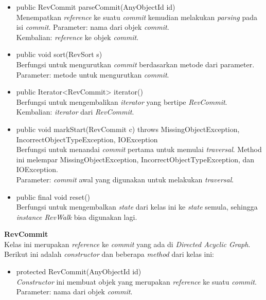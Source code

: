 \documentclass[a4paper,twoside]{article}
\begin{document}
\begin{enumerate}
\begin{itemize}
\item public RevCommit parseCommit(AnyObjectId id)\\
Menempatkan \textit{reference} ke suatu \textit{commit} kemudian melakukan \textit{parsing} pada isi \textit{commit}.
Parameter: nama dari objek \textit{commit}.\\
Kembalian: \textit{reference} ke objek \textit{commit}.

\item public void sort(RevSort s)\\
Berfungsi untuk mengurutkan \textit{commit} berdasarkan metode dari parameter.\\
Parameter: metode untuk mengurutkan \textit{commit}.

\item public Iterator<RevCommit> iterator()\\
Berfungsi untuk mengembalikan \textit{iterator} yang bertipe \textit{RevCommit}.\\
Kembalian: \textit{iterator} dari \textit{RevCommit}.

\item public void markStart(RevCommit c) throws MissingObjectException, IncorrectObjectTypeException, IOException\\
Berfungsi untuk menandai \textit{commit} pertama untuk memulai \textit{traversal}. Method ini melempar MissingObjectException, IncorrectObjectTypeException, dan IOException.\\
Parameter: \textit{commit} awal yang digunakan untuk melakukan \textit{traversal}.

\item public final void reset()\\
Berfungsi untuk mengembalkan \textit{state} dari kelas ini ke \textit{state} semula, sehingga \textit{instance RevWalk} bisa digunakan lagi.
\end{itemize}

\textbf{RevCommit}\\
Kelas ini merupakan \textit{reference} ke \textit{commit} yang ada di \textit{Directed Acyclic Graph}. Berikut ini adalah \textit{constructor} dan beberapa \textit{method} dari kelas ini:
\begin{itemize}
\item protected RevCommit(AnyObjectId id)\\
\textit{Constructor} ini membuat objek yang merupakan \textit{reference} ke suatu \textit{commit}.\\
Parameter: nama dari objek \textit{commit}.  


\end{itemize}
\end{enumerate}
\end{document}
